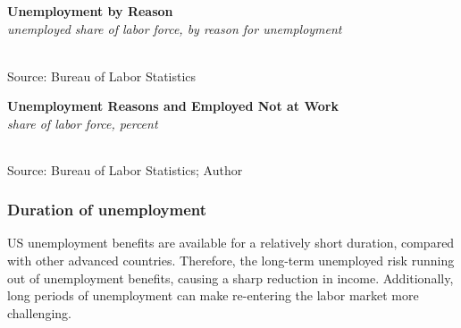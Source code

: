 \documentclass{report}
\makeatletter
\newcommand{\tbllink}[1]{\href{https://raw.githubusercontent.com/bdecon/US-chartbook/master/chartbook/data/#1}{\faTable}}
\newcommand*\short[1]{\expandafter\@gobbletwo\number\numexpr#1\relax}
\newcommand{\ctsbar}[5]{
		\addplot[ybar stacked, bar width=#5, draw opacity=0, fill=#1] 
			table [x=#2, y=#3, col sep=comma]{#4};}
\newcommand{\dateaxisticks}{
		date coordinates in=x, axis line style={draw=none},
		xmax={2022-01-30},
		max space between ticks=40,	    
		xtick={{1990-01-01}, {1992-01-01}, {1994-01-01}, 
			{1996-01-01}, {1998-01-01}, {2000-01-01}, 
			{2002-01-01}, {2004-01-01}, {2006-01-01},
			{2008-01-01}, {2010-01-01}, {2012-01-01}, {2014-01-01},
		    {2016-01-01}, {2018-01-01}, {2020-01-01}, {2022-01-01}},
		minor xtick={{1989-01-01}, {1991-01-01}, {1993-01-01},
			{1995-01-01}, {1997-01-01}, {1999-01-01}, 
			{2001-01-01}, {2003-01-01}, {2005-01-01}, {2007-01-01},
		    {2009-01-01}, {2011-01-01}, {2013-01-01}, {2015-01-01},
		    {2017-01-01}, {2019-01-01}, {2021-01-01}},
		enlarge y limits={0.06}, enlarge x limits={0.01},
		}
\newcommand{\bbar}[2]{extra #1 ticks = {{#2}}, extra #1 tick labels = ,
		extra #1 tick style = {grid=major, grid style={thick, black!25}},}
\newcommand{\rbars}{
		\fill[color=black!10] (axis cs:{1990-07-01},\pgfkeysvalueof{/pgfplots/ymin}) rectangle 
			(axis cs:{1991-03-01}, \pgfkeysvalueof{/pgfplots/ymax});
		\fill[color=black!10] (axis cs:{2007-12-01},\pgfkeysvalueof{/pgfplots/ymin}) rectangle 
			(axis cs:{2009-07-01}, \pgfkeysvalueof{/pgfplots/ymax});
		\fill[color=black!10] (axis cs:{2001-03-01},\pgfkeysvalueof{/pgfplots/ymin}) rectangle 
			(axis cs:{2001-11-01}, \pgfkeysvalueof{/pgfplots/ymax});
		\fill[color=black!10] (axis cs:{2020-02-01},\pgfkeysvalueof{/pgfplots/ymin}) rectangle 
			(axis cs:{2020-05-01}, \pgfkeysvalueof{/pgfplots/ymax});}
\makeatother
\begin{document}
{{\begin{minipage}{0.99\textwidth} 
\normalsize \textbf{Unemployment by Reason}\\
\footnotesize{\textit{unemployed share of labor force, by reason for unemployment}}\\
\hspace*{-2mm} \\
\footnotesize{Source: Bureau of Labor Statistics} \hfill \tbllink{unemp_reason.csv}
\vspace{4mm}

\normalsize \textbf{Unemployment Reasons and Employed Not at Work}\\
\footnotesize{\textit{share of labor force, percent}}\\
 \setlength{\tabcolsep}{3.1pt} \color{black!90}
	{\renewcommand{\arraystretch}{1.55}
		\begin{tabular}{p{31mm} R{6.7mm} R{6.7mm} R{6.7mm} R{6.7mm} R{6.7mm} R{6.7mm} 
		   R{6.7mm} R{6.7mm} R{6.7mm} R{6.7mm} R{6.7mm}}
			  \hline
		\end{tabular}}\vspace{-2mm}
		
\footnotesize{Source: Bureau of Labor Statistics; Author}
\end{minipage}
\newpage
\begin{minipage}{0.76\textwidth} 
\subsubsection*{\color{black!70} \seriffont Duration of unemployment}
\small US unemployment benefits are available for a relatively short duration, compared with other advanced countries. Therefore, the long-term unemployed risk running out of unemployment benefits, causing a sharp reduction in income. Additionally, long periods of unemployment can make re-entering the labor market more challenging. 


\end{minipage}}}
\end{document}

